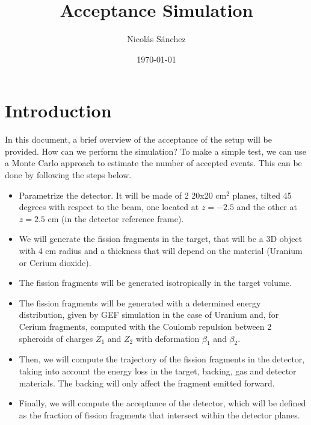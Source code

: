 \documentclass{article}
\title{Acceptance Simulation}
\author{Nicolás Sánchez}
\date{\today}
\begin{document}
\maketitle

\section{Introduction}
In this document, a brief overview of the acceptance of the setup will be provided. How can we perform the simulation?
 To make a simple test, we can use a Monte Carlo approach to estimate the number of accepted events.
 This can be done by following the steps below.
 \begin{itemize}
 \item Parametrize the detector. It will be made of 2 20x20 $\text{cm}^2$ planes, tilted 45 degrees with respect to the beam, one located at $z=-2.5$ and the other at $z=2.5$ cm (in the detector reference frame).
 \item We will generate the fission fragments in the target, that will be a 3D object with 4 cm radius and a thickness that will depend on the material (Uranium or Cerium dioxide).
 \item The fission fragments will be generated isotropically in the target volume.
 \item The fission fragments will be generated with a determined energy distribution, given by GEF simulation in the case of Uranium and, for Cerium fragments, computed with the Coulomb repulsion between 2 spheroids of charges $Z_1$ and $Z_2$ with deformation $\beta_1$ and $\beta_2$.
 \item Then, we will compute the trajectory of the fission fragments in the detector, taking into account the energy loss in the target, backing, gas and detector materials. The backing will only affect the fragment emitted forward.
 \item Finally, we will compute the acceptance of the detector, which will be defined as the fraction of fission fragments that intersect within the detector planes.
 \end{itemize}
\end{document}

